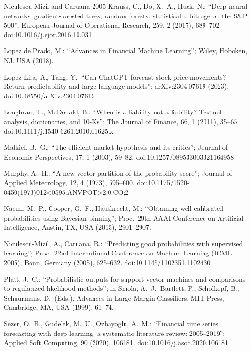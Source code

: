 \documentclass[10pt,a4paper,oneside]{article}
\theoremstyle{definition}
\theoremstyle{plain}
\begin{document}
{\begin{thebibliography}{Niculescu-Mizil and Caruana 2005}
Krauss, C., Do, X.\ A., Huck, N.: ``Deep neural networks, gradient-boosted trees,
random forests: statistical arbitrage on the S\&P 500''; European Journal of
Operational Research, 259, 2 (2017), 689--702. doi:10.1016/j.ejor.2016.10.031

Lopez de Prado, M.: ``Advances in Financial Machine Learning''; Wiley, Hoboken, NJ,
USA (2018).

Lopez-Lira, A., Tang, Y.: ``Can ChatGPT forecast stock price movements? Return
predictability and large language models''; arXiv:2304.07619 (2023).
doi:10.48550/arXiv.2304.07619

Loughran, T., McDonald, B.: ``When is a liability not a liability? Textual analysis,
dictionaries, and 10-Ks''; The Journal of Finance, 66, 1 (2011), 35--65.
doi:10.1111/j.1540-6261.2010.01625.x

Malkiel, B.\ G.: ``The efficient market hypothesis and its critics''; Journal of
Economic Perspectives, 17, 1 (2003), 59--82. doi:10.1257/089533003321164958

Murphy, A.\ H.: ``A new vector partition of the probability score''; Journal of Applied
Meteorology, 12, 4 (1973), 595--600.
doi:10.1175/1520-0450(1973)012<0595:ANVPOT>2.0.CO;2

Naeini, M.\ P., Cooper, G.\ F., Hauskrecht, M.: ``Obtaining well calibrated
probabilities using Bayesian binning''; Proc.\ 29th AAAI Conference on Artificial
Intelligence, Austin, TX, USA (2015), 2901--2907.

Niculescu-Mizil, A., Caruana, R.: ``Predicting good probabilities with supervised
learning''; Proc.\ 22nd International Conference on Machine Learning (ICML 2005),
Bonn, Germany (2005), 625--632. doi:10.1145/1102351.1102430

Platt, J.\ C.: ``Probabilistic outputs for support vector machines and comparisons to
regularized likelihood methods''; in Smola, A.\ J., Bartlett, P., Sch\"olkopf, B.,
Schuurmans, D.\ (Eds.), Advances in Large Margin Classifiers, MIT Press, Cambridge,
MA, USA (1999), 61--74.

Sezer, O.\ B., Gudelek, M.\ U., Ozbayoglu, A.\ M.: ``Financial time series forecasting
with deep learning: a systematic literature review: 2005--2019''; Applied Soft
Computing, 90 (2020), 106181. doi:10.1016/j.asoc.2020.106181


\end{thebibliography}}
\end{document}
